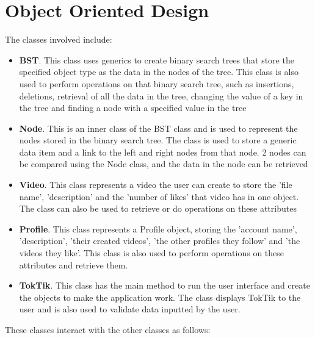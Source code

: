 \documentclass{assignment}
\begin{document}


\newpage

\section{Object Oriented Design}

The classes involved include: 
\begin{itemize}
    
    \item \textbf{BST}. This class uses generics to create binary search trees that store the specified object type as the data in the nodes of the tree. This class is also used to perform operations on that binary search tree, such as insertions, deletions, retrieval of all the data in the tree, changing the value of a key in the tree and finding a node with a specified value in the tree
    \item \textbf{Node}. This is an inner class  of the BST class and is used to represent the nodes stored in the binary search tree. The class is used to store a generic data item and a link to the left and right nodes from that node. 2 nodes can be compared using the Node class, and the data in the node can be retrieved
    \item \textbf{Video}. This class represents a video the user can create to store the 'file name', 'description' and the 'number of likes' that video has in one object. The class can also be used to retrieve or do operations on these attributes
    
    \item \textbf{Profile}. This class represents a Profile object, storing the 'account name', 'description', 'their created videos', 'the other profiles they follow' and 'the videos they like'. This class is also used to perform operations on these attributes and retrieve them. 

    \item \textbf{TokTik}. This class has the main method to run the user interface and create the objects to make the application work. The class displays TokTik to the user and is also used to validate data inputted by the user.
    
\end{itemize}
These classes interact with the other classes as follows:
\end{document}
